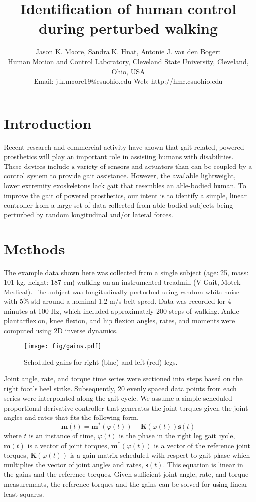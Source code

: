 \documentclass[10pt,letterpaper,notitlepage,twocolumn]{article}
\title{\bf Identification of human control during perturbed walking}
\author{
  Jason K. Moore, Sandra K. Hnat, Antonie J. van den Bogert\\
  Human Motion and Control Laboratory, Cleveland State University, Cleveland, Ohio, USA\\
  Email: j.k.moore19@csuohio.edu Web: http://hmc.csuohio.edu
}
\date{}
\begin{document}
\maketitle

\section*{Introduction}
%
Recent research and commercial activity have shown that gait-related, powered
prosthetics will play an important role in assisting humans with disabilities.
These devices include a variety of sensors and actuators than can be coupled by
a control system to provide gait assistance. However, the available
lightweight, lower extremity exoskeletons lack gait that resembles an
able-bodied human. To improve the gait of powered prosthetics, our intent is to
identify a simple, linear controller from a large set of data collected from
able-bodied subjects being perturbed by random longitudinal and/or lateral
forces.
%
\section*{Methods}
The example data shown here was collected from a single subject (age: 25, mass:
101 kg, height: 187 cm) walking on an instrumented treadmill (V-Gait, Motek
Medical). The subject was longitudinally perturbed using random white noise
with 5\% std around a nominal 1.2 m/s belt speed. Data was recorded for 4
minutes at 100 Hz, which included approximately 200 steps of walking.  Ankle
plantarflexion, knee flexion, and hip flexion angles, rates, and moments were
computed using 2D inverse dynamics.
%
\begin{figure}[hbt]
  \begin{center}
    \texttt{[image: fig/gains.pdf]}
    \caption{Scheduled gains for right (blue) and left (red) legs.}
    \label{fig:gains}
  \end{center}
\end{figure}

Joint angle, rate, and torque time series were sectioned into steps based on
the right foot's heel strike. Subsequently, 20 evenly spaced data points from
each series were interpolated along the gait cycle. We assume a simple
scheduled proportional derivative controller that generates the joint torques
given the joint angles and rates that fits the following form.
%
\begin{equation}
  \mathbf{m}(t) = \mathbf{m}^*(\varphi(t)) -
  \mathbf{K}(\varphi(t))\mathbf{s}(t)
\end{equation}
%
where $t$ is an instance of time, $\varphi(t)$ is the phase in the right leg
gait cycle, $\mathbf{m}(t)$ is a vector of joint torques,
$\mathbf{m}^*(\varphi(t))$ is a vector of the reference joint torques,
$\mathbf{K}(\varphi(t))$ is a gain matrix scheduled with respect to gait
phase which multiplies the vector of joint angles and rates, $\mathbf{s}(t)$.
This equation is linear in the gains and the reference torques. Given
sufficient joint angle, rate, and torque measurements, the reference torques
and the gains can be solved for using linear least squares.
%
\end{document}
